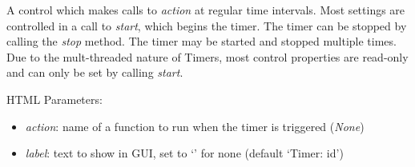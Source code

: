 \documentclass[letterpaper,10pt,english]{sphinxmanual}
\begin{document}
\begin{fulllineitems}
\label{api:controls.Timer}
A control which makes calls to \emph{action} at regular time intervals. Most 
settings are controlled in a call to \emph{start}, which begins the timer. The 
timer can be stopped by calling the \emph{stop} method. The timer may be started 
and stopped multiple times. Due to the mult-threaded nature of Timers, most
control properties are read-only and can only be set by calling \emph{start}.

HTML Parameters:
\begin{itemize}
\item {} 
\emph{action}: name of a function to run when the timer is triggered (\emph{None})

\item {} 
\emph{label}: text to show in GUI, set to `' for none (default `Timer: id')

\end{itemize}

\begin{fulllineitems}
\label{api:controls.Timer.action}
\end{fulllineitems}


\begin{fulllineitems}
\label{api:controls.Timer.interval}
\end{fulllineitems}


\begin{fulllineitems}
\label{api:controls.Timer.retrigger}
\end{fulllineitems}


\begin{fulllineitems}
\label{api:controls.Timer.running}
\end{fulllineitems}


\begin{fulllineitems}
\label{api:controls.Timer.start}
\end{fulllineitems}


\begin{fulllineitems}
\label{api:controls.Timer.stop}
\end{fulllineitems}


\end{fulllineitems}
\end{document}
